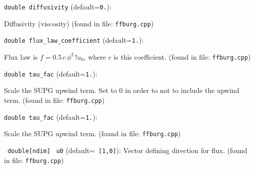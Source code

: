 \item\verb+double diffusivity+ {\rm(default=\verb|0.|)}:

Diffusivity (viscosity)
 (found in file: \verb+ffburg.cpp+)
\item\verb+double flux_law_coefficient+ {\rm(default=\verb|1.|)}:

Flux law is $f= 0.5\,c\, \phi^2\,!u_0$, where $c$
is this coefficient. 
 (found in file: \verb+ffburg.cpp+)
\item\verb+double tau_fac+ {\rm(default=\verb|1.|)}:

Scale the SUPG upwind term. Set to 0 in order to
 not to include the upwind term. 
 (found in file: \verb+ffburg.cpp+)
\item\verb+double tau_fac+ {\rm(default=\verb|1.|)}:

Scale the SUPG upwind term. 
 (found in file: \verb+ffburg.cpp+)
\item\verb+ double[ndim]+ \verb+ u0+ {\rm(default=\verb| [1,0]|)}:
 Vector defining direction for flux. 
 (found in file: \verb+ffburg.cpp+)
